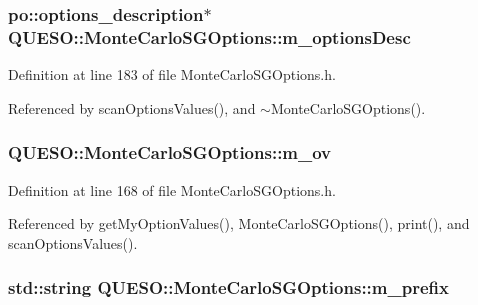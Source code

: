 \hypertarget{class_q_u_e_s_o_1_1_monte_carlo_s_g_options_a233cc25a5ce7af85c0464ca89341d008}{
\subsubsection[{m\-\_\-options\-Desc}]{\setlength{\rightskip}{0pt plus 5cm}po\-::options\-\_\-description$\ast$ Q\-U\-E\-S\-O\-::\-Monte\-Carlo\-S\-G\-Options\-::m\-\_\-options\-Desc\hspace{0.3cm}{\ttfamily [private]}}}\label{class_q_u_e_s_o_1_1_monte_carlo_s_g_options_a233cc25a5ce7af85c0464ca89341d008}


Definition at line 183 of file Monte\-Carlo\-S\-G\-Options.\-h.



Referenced by scan\-Options\-Values(), and $\sim$\-Monte\-Carlo\-S\-G\-Options().

\hypertarget{class_q_u_e_s_o_1_1_monte_carlo_s_g_options_a4bc6849a41ede87425cad9ab6e97df11}{
\subsubsection[{m\-\_\-ov}]{ Q\-U\-E\-S\-O\-::\-Monte\-Carlo\-S\-G\-Options\-::m\-\_\-ov}}\label{class_q_u_e_s_o_1_1_monte_carlo_s_g_options_a4bc6849a41ede87425cad9ab6e97df11}


Definition at line 168 of file Monte\-Carlo\-S\-G\-Options.\-h.



Referenced by get\-My\-Option\-Values(), Monte\-Carlo\-S\-G\-Options(), print(), and scan\-Options\-Values().

\hypertarget{class_q_u_e_s_o_1_1_monte_carlo_s_g_options_ac640fa60af7134d4113e9b7481a34f6c}{
\subsubsection[{m\-\_\-prefix}]{\setlength{\rightskip}{0pt plus 5cm}std\-::string Q\-U\-E\-S\-O\-::\-Monte\-Carlo\-S\-G\-Options\-::m\-\_\-prefix}}\label{class_q_u_e_s_o_1_1_monte_carlo_s_g_options_ac640fa60af7134d4113e9b7481a34f6c}


